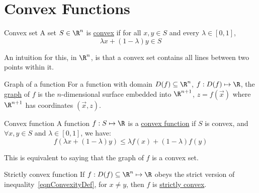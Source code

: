 \documentclass[../Main.tex]{subfiles}
\begin{document}
\section{Convex Functions}
\begin{definition}{Convex set}
    A set $S \in \R^n$ is \underline{convex} if for all $x, y \in S$ and every $\lambda \in [0, 1]$,
    \begin{equation*}
        \lambda x + (1 - \lambda) y \in S
    \end{equation*}
\end{definition}
\begin{remark}
    An intuition for this, in $\R^n$, is that a convex set contains all lines between two points within it.
\end{remark}
\begin{definition}{Graph of a function}
    For a function with domain $D(f) \subseteq \R^n$, $f : D(f) \mapsto \R$, the \underline{graph} of $f$ is the $n$-dimensional surface embedded into $\R^{n+1}$, $z = f(\vec{x})$ where $\R^{n+1}$ has coordinates $(\vec{x}, z)$.
\end{definition}
\begin{definition}{Convex function}
    A function $f : S \mapsto \R$ is a \underline{convex function} if $S$ is convex, and $\forall x, y \in S$ and $\lambda \in [0, 1]$, we have:
    \begin{equation}
        f(\lambda x + (1-\lambda)y) \leq \lambda f(x) + (1 - \lambda) f(y)
        \label{eqnConvexityDef}
    \end{equation}
\end{definition}
\begin{remark}
    This is equivalent to saying that the graph of $f$ is a convex set.
\end{remark}
\begin{definition}{Strictly convex function}
    If $f : D(f) \subseteq \R^n \mapsto \R$ obeys the strict version of inequality~\ref{eqnConvexityDef}, for $x \neq y$, then $f$ is \underline{strictly convex}.
\end{definition}
\end{document}
